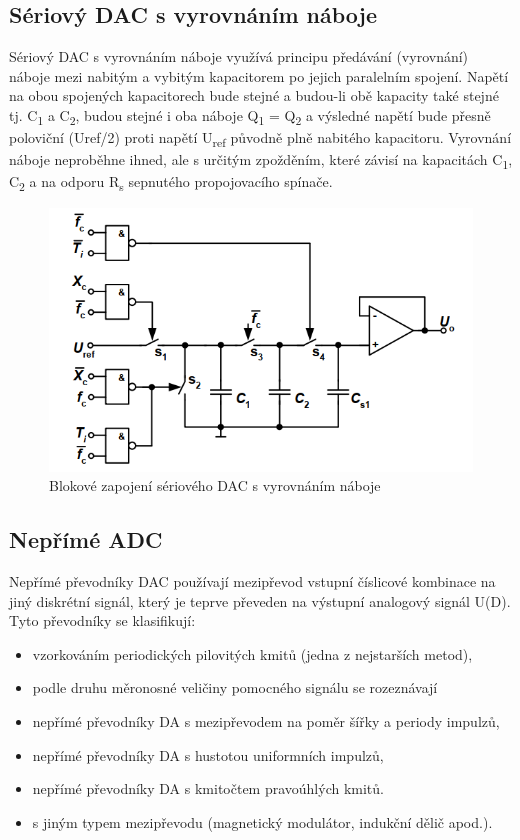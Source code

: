 \subsection{Sériový DAC s vyrovnáním náboje}
Sériový DAC s vyrovnáním náboje využívá principu předávání (vyrovnání) náboje mezi nabitým a vybitým kapacitorem po jejich paralelním spojení. Napětí na obou spojených kapacitorech bude stejné a budou-li obě kapacity také stejné tj. C\textsubscript{1} a C\textsubscript{2}, budou stejné i oba náboje Q\textsubscript{1} = Q\textsubscript{2} a výsledné napětí bude přesně poloviční (Uref/2) proti napětí U\textsubscript{ref} původně plně nabitého kapacitoru. Vyrovnání náboje neproběhne ihned, ale s určitým zpožděním, které závisí na kapacitách C\textsubscript{1}, C\textsubscript{2} a na odporu R\textsubscript{s} sepnutého propojovacího spínače.
\begin{figure}[h]
   \begin{center}
     \includegraphics[scale=0.6]{images/DAvyrov.png}
   \end{center}
   \caption{Blokové zapojení sériového DAC s vyrovnáním náboje}
\end{figure}



\subsection{Nepřímé ADC}
Nepřímé převodníky DAC používají mezipřevod vstupní číslicové kombinace na jiný diskrétní signál, který je teprve převeden na výstupní analogový signál U(D). Tyto převodníky se klasifikují:
\begin{itemize}
\item vzorkováním periodických pilovitých kmitů (jedna z nejstarších metod),
\item podle druhu měronosné veličiny pomocného signálu se rozeznávají
\item nepřímé převodníky DA s mezipřevodem na poměr šířky a periody impulzů,
\item nepřímé převodníky DA s hustotou uniformních impulzů,
\item nepřímé převodníky DA s kmitočtem pravoúhlých kmitů.
\item s jiným typem mezipřevodu (magnetický modulátor, indukční dělič apod.).
\end{itemize}

